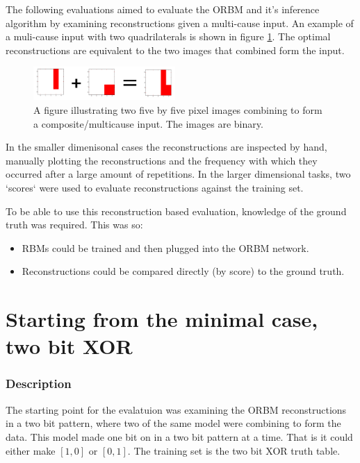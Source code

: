 The following evaluations aimed to evaluate the ORBM and it's inference algorithm by examining reconstructions given a multi-cause input. An example of a muli-cause input with two quadrilaterals is shown in figure \ref{F:Composite-Example}. The optimal reconstructions are equivalent to the two images that combined form the input.

\begin{figure}
  \begin{center}
    \includegraphics[width=0.48\textwidth]{Assets/Composite-Example.png}
  \end{center}
  \caption{A figure illustrating two five by five pixel images combining to form a composite/multicause input. The images are binary.}
  \label{F:Composite-Example}
\end{figure}

In the smaller dimenisonal cases the reconstructions are inspected by hand, manually plotting the reconstructions and the frequency with which they occurred after a large amount of repetitions. In the larger dimensional tasks, two `scores` were used to evaluate reconstructions against the training set.

To be able to use this reconstruction based evaluation, knowledge of the ground truth was required. This was so:
\begin{itemize}
  \item RBMs could be trained and then plugged into the ORBM network.
  \item Reconstructions could be compared directly (by score) to the ground truth.
\end{itemize}

\section{Starting from the minimal case, two bit XOR }

\subsubsection{Description}

The starting point for the evalatuion was examining the ORBM reconstructions in a two bit pattern, where two of the same model were combining to form the data. This model made one bit on in a two bit pattern at a time. That is it could either make $[1 , 0]$ or $[0 , 1]$. The training set is the two bit XOR truth table.



